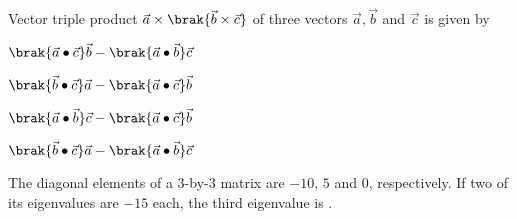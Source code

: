 \item Vector triple product $\vec{a} \times \brak{\vec{b} \times \vec{c}}$ of three vectors $\vec{a}, \vec{b}$ and $\vec{c}$ is given by
\hfill{}
\begin{enumerate}
\begin{multicols}{2}
\item $\brak{\vec{a} \bullet \vec{c}}\vec{b} - \brak{\vec{a} \bullet \vec{b}}\vec{c}$
\item $\brak{\vec{b} \bullet \vec{c}}\vec{a} - \brak{\vec{a} \bullet \vec{c}}\vec{b}$
\item $\brak{\vec{a} \bullet \vec{b}}\vec{c} - \brak{\vec{a} \bullet \vec{c}}\vec{b}$
\item $\brak{\vec{b} \bullet \vec{c}}\vec{a} - \brak{\vec{a} \bullet \vec{b}}\vec{c}$
\end{multicols}
\end{enumerate}
\item The diagonal elements of a 3-by-3 matrix are $-10$, $5$ and $0$, respectively. If two of its eigenvalues are $-15$ each, the third eigenvalue is \underline{\hspace{2cm}}.
\hfill{}
